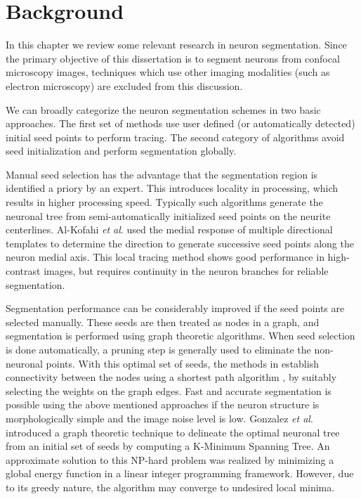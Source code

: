 
\chapter{Background} %

\label{Chapter2} %



In this chapter we review some relevant research in neuron segmentation. Since the primary objective of this dissertation is to segment neurons from confocal microscopy images, techniques which use other imaging modalities (such as electron microscopy) are excluded from this discussion.

We can broadly categorize the neuron segmentation schemes in two basic approaches. The first set of methods use user defined (or automatically detected) initial seed points to perform tracing. The second category of algorithms avoid seed initialization and perform segmentation globally.

Manual seed selection has the advantage that the segmentation region is identified a priory by an expert. This introduces locality in processing, which results in higher processing speed. Typically such algorithms generate the neuronal tree from semi-automatically initialized seed points on the neurite centerlines. Al-Kofahi \textit{et al}. \cite{al_kofahi} used the medial response of multiple directional templates to determine the  direction to generate successive seed points along the neuron medial axis. This local tracing method shows good performance in high-contrast images, but requires continuity in the neuron branches for reliable segmentation. 

Segmentation performance can be considerably improved if the seed points are selected manually. These seeds are then treated as nodes in a graph, and segmentation is performed using graph theoretic algorithms. When seed selection is done automatically, a pruning step is generally used to eliminate the non-neuronal points. With this optimal set of seeds, the methods in \cite{peng_anisotropicPS,peng_GAD,peng_APP} establish connectivity between the nodes using a shortest path algorithm \cite{dijkstra1959note}, by suitably selecting the weights on the graph edges. Fast and accurate segmentation is possible using the above mentioned approaches if the neuron structure is morphologically simple and the image noise level is low. Gonzalez \textit{et al}. \cite{gonzalez_2010} introduced a graph theoretic technique to delineate the optimal neuronal tree from an initial set of seeds by computing a K-Minimum Spanning Tree. An approximate solution to this NP-hard problem was realized by minimizing a global energy function in a linear integer programming framework. However, due to its  greedy nature, the algorithm may converge to undesired local minima. 

